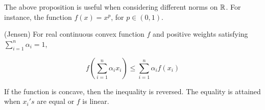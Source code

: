 \documentclass{article}
\begin{document}
The above proposition is useful when considering different norms on $\mathbb{R}$. For instance, the function
$f(x)=x^p$, for $p\in (0,1)$.  

\begin{prop}
(Jensen) 
For real continuous convex function $f$ and positive weights satisfying $\sum_{i=1}^n \alpha_i=1$,  

\begin{equation*}
    f\left(\sum_{i=1}^n \alpha_i x_i\right) \leq \sum_{i=1}^n \alpha_i f(x_i)
\end{equation*}

If the function is concave, then the inequality is reversed.  
The equality is attained when $x_i's$ are equal or $f$ is linear.
\end{prop}
\end{document}
